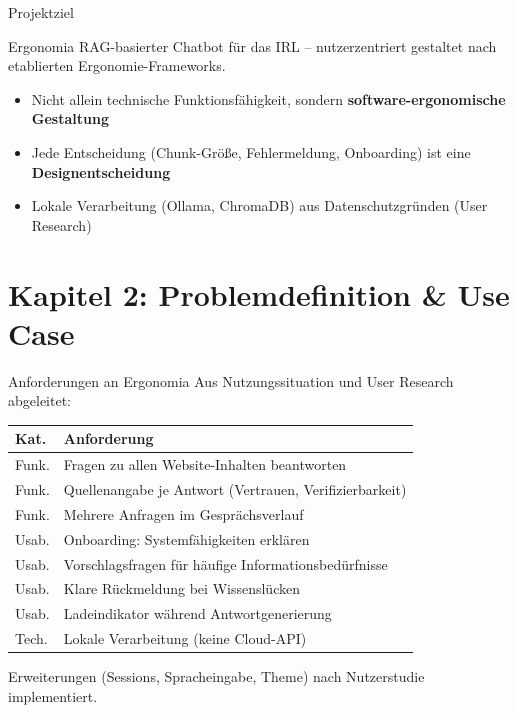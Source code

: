 \documentclass[14pt,aspectratio=169]{beamer}
\begin{document}
\begin{frame}{Projektziel}
    \begin{block}{Ergonomia}
        RAG-basierter Chatbot für das IRL -- \alert{nutzerzentriert gestaltet} nach etablierten Ergonomie-Frameworks.
    \end{block}
    \vspace{0.3cm}
    \begin{itemize}
        \item Nicht allein technische Funktionsfähigkeit, sondern \textbf{software-ergonomische Gestaltung}
        \item Jede Entscheidung (Chunk-Größe, Fehlermeldung, Onboarding) ist eine \textbf{Designentscheidung}
        \item Lokale Verarbeitung (Ollama, ChromaDB) aus Datenschutzgründen (User Research)
    \end{itemize}
\end{frame}

\section{Kapitel 2: Problemdefinition \& Use Case}

\begin{frame}{Anforderungen an Ergonomia}
    Aus Nutzungssituation und User Research abgeleitet:
    \small
    \begin{tabularx}{\textwidth}{@{}l X@{}}
        \toprule
        \textbf{Kat.} & \textbf{Anforderung} \\
        \midrule
        Funk. & Fragen zu allen Website-Inhalten beantworten \\
        Funk. & Quellenangabe je Antwort (Vertrauen, Verifizierbarkeit) \\
        Funk. & Mehrere Anfragen im Gesprächsverlauf \\
        Usab. & Onboarding: Systemfähigkeiten erklären \\
        Usab. & Vorschlagsfragen für häufige Informationsbedürfnisse \\
        Usab. & Klare Rückmeldung bei Wissenslücken \\
        Usab. & Ladeindikator während Antwortgenerierung \\
        Tech. & Lokale Verarbeitung (keine Cloud-API) \\
        \bottomrule
    \end{tabularx}
    \normalsize
    \vspace{0.2cm}
    \small Erweiterungen (Sessions, Spracheingabe, Theme) nach Nutzerstudie implementiert.
\end{frame}
\end{document}
